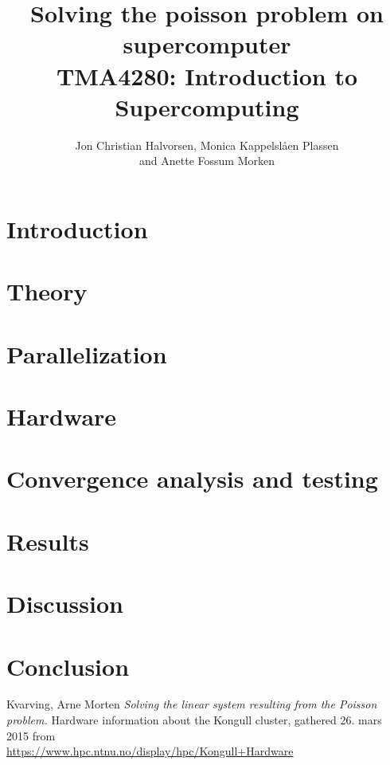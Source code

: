 \documentclass[12pt, a4paper]{article} %
\title{Solving the poisson problem on supercomputer \\
TMA4280: Introduction to Supercomputing}
\author[]{Jon Christian Halvorsen, Monica Kappelslåen Plassen \\and Anette Fossum Morken}
\date{}
\begin{document}
\maketitle
{}

\section*{Introduction}


\section*{Theory}


\section*{Parallelization}

 
\section*{Hardware}
 
 
\section*{Convergence analysis and testing}


\section*{Results}


\section*{Discussion}


\section*{Conclusion}



\begin{thebibliography}{10}
 Kvarving, Arne Morten \emph{Solving the linear system resulting from the Poisson problem.}
 Hardware information about the Kongull cluster, gathered 26. mars 2015 from \\ \url{https://www.hpc.ntnu.no/display/hpc/Kongull+Hardware}
\end{thebibliography}
\end{document}
